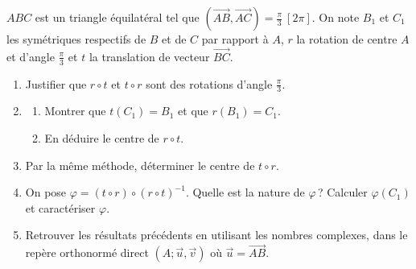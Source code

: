 \begin{exo}\label{exo:isom-rotation-translation}
      $ABC$ est un triangle équilatéral tel que $(\overrightarrow{AB},\overrightarrow{AC}) = \frac{\pi}{3}\ [2\pi]$.
      On note $B_1$ et $C_1$ les symétriques respectifs de $B$ et de $C$ par rapport à $A$,
      $r$ la rotation de centre $A$ et d'angle $\frac{\pi}{3}$ et $t$ la translation de vecteur $\overrightarrow{BC}$.
      \begin{enumerate}
            \item Justifier que $r \circ t$ et $t \circ r$ sont des rotations d'angle $\frac{\pi}{3}$.
            \item \begin{enumerate}
                        \item Montrer que $t(C_1) = B_1$ et que $r(B_1) = C_1$.
                        \item En déduire le centre de $r \circ t$.
                  \end{enumerate}
            \item Par la même méthode, déterminer le centre de $t \circ r$.
            \item On pose $\varphi = (t \circ r) \circ (r \circ t)^{-1}$.
                  Quelle est la nature de $\varphi$\,? Calculer $\varphi(C_1)$ et caractériser $\varphi$.
            \item Retrouver les résultats précédents en utilisant les nombres complexes, dans le repère orthonormé
                  direct $(A;\vec{u},\vec{v})$ où $\vec{u} = \overrightarrow{AB}$.
      \end{enumerate}
\end{exo}
